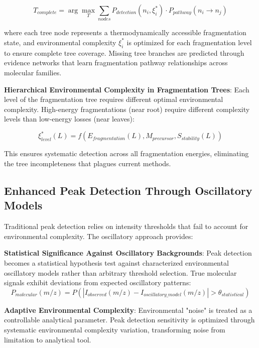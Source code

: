 \documentclass[11pt,a4paper]{article}
\begin{document}
\begin{equation}
T_{complete} = \arg\max_T \sum_{nodes} P_{detection}(n_i, \xi^*_i) \cdot P_{pathway}(n_i \rightarrow n_j)
\end{equation}

where each tree node represents a thermodynamically accessible fragmentation state, and environmental complexity $\xi^*_i$ is optimized for each fragmentation level to ensure complete tree coverage. Missing tree branches are predicted through evidence networks that learn fragmentation pathway relationships across molecular families.

\textbf{Hierarchical Environmental Complexity in Fragmentation Trees}: Each level of the fragmentation tree requires different optimal environmental complexity. High-energy fragmentations (near root) require different complexity levels than low-energy losses (near leaves):

\begin{equation}
\xi_{level}^*(L) = f(E_{fragmentation}(L), M_{precursor}, S_{stability}(L))
\end{equation}

This ensures systematic detection across all fragmentation energies, eliminating the tree incompleteness that plagues current methods.

\subsection{Enhanced Peak Detection Through Oscillatory Models}

Traditional peak detection relies on intensity thresholds that fail to account for environmental complexity. The oscillatory approach provides:

\textbf{Statistical Significance Against Oscillatory Backgrounds}: Peak detection becomes a statistical hypothesis test against characterized environmental oscillatory models rather than arbitrary threshold selection. True molecular signals exhibit deviations from expected oscillatory patterns:
\begin{equation}
P_{molecular}(m/z) = P(|I_{observed}(m/z) - I_{oscillatory\_model}(m/z)| > \theta_{statistical})
\end{equation}

\textbf{Adaptive Environmental Complexity}: Environmental "noise" is treated as a controllable analytical parameter. Peak detection sensitivity is optimized through systematic environmental complexity variation, transforming noise from limitation to analytical tool.
\end{document}
